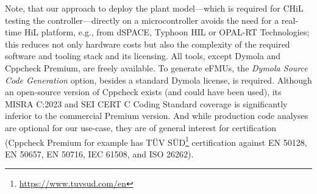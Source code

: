 \noindent{}Note, that our approach to deploy the plant model---which is required for CHiL testing the controller---directly on a microcontroller avoids the need for a real-time HiL platform, e.g., from dSPACE\regtm{}, Typhoon HIL\regtm{} or OPAL-RT Technologies\regtm{}; this reduces not only hardware costs but also the complexity of the required software and tooling stack and its licensing. All tools, except Dymola and Cppcheck Premium, are freely available. To generate eFMUs, the \textit{Dymola Source Code Generation} option, besides a standard Dymola license, is required. Although an open-source version of Cppcheck exists (and could have been used), its MISRA C:2023 and SEI CERT C Coding Standard coverage is significantly inferior to the commercial Premium version. And while production code analyses are optional for our use-case, they are of general interest for certification (Cppcheck Premium for example has TÜV SÜD\regtm{}\footnote{\tiny{\url{https://www.tuvsud.com/en}}} certification against EN 50128, EN 50657, EN 50716, IEC 61508, and ISO 26262).
